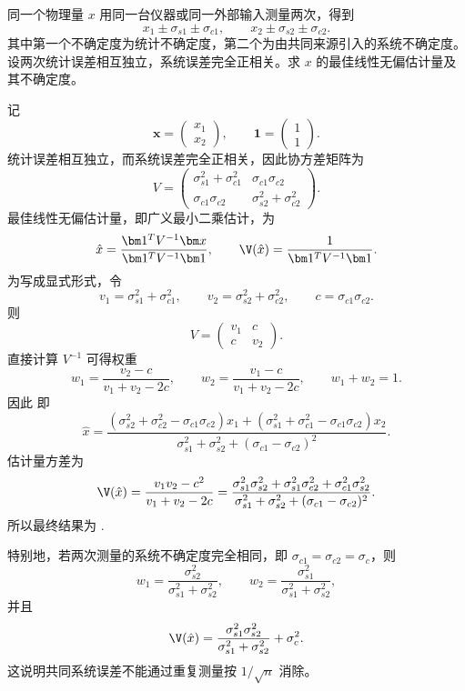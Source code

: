 \begin{question}[相关系统误差下的最佳平均]
同一个物理量 $x$ 用同一台仪器或同一外部输入测量两次，得到
\[
x_1\pm\sigma_{s1}\pm\sigma_{c1},
\qquad
x_2\pm\sigma_{s2}\pm\sigma_{c2}.
\]
其中第一个不确定度为统计不确定度，第二个为由共同来源引入的系统不确定度。设两次统计误差相互独立，系统误差完全正相关。求 $x$ 的最佳线性无偏估计量及其不确定度。
\begin{solution}
记
\[
\bm x=\begin{pmatrix}x_1\\x_2\end{pmatrix},
\qquad
\bm 1=\begin{pmatrix}1\\1\end{pmatrix}.
\]
统计误差相互独立，而系统误差完全正相关，因此协方差矩阵为
\[
V=\begin{pmatrix}
\sigma_{s1}^2+\sigma_{c1}^2 & \sigma_{c1}\sigma_{c2}\\
\sigma_{c1}\sigma_{c2} & \sigma_{s2}^2+\sigma_{c2}^2
\end{pmatrix}.
\]
最佳线性无偏估计量，即广义最小二乘估计，为
\[
\hat x=\frac{\bm 1^TV^{-1}\bm x}{\bm 1^TV^{-1}\bm 1},
\qquad
\V(\hat x)=\frac1{\bm 1^TV^{-1}\bm 1}.
\]
为写成显式形式，令
\[
v_1=\sigma_{s1}^2+\sigma_{c1}^2,
\qquad
v_2=\sigma_{s2}^2+\sigma_{c2}^2,
\qquad
c=\sigma_{c1}\sigma_{c2}.
\]
则
\[
V=\begin{pmatrix}v_1&c\\c&v_2\end{pmatrix}.
\]
直接计算 $V^{-1}$ 可得权重
\[
w_1=\frac{v_2-c}{v_1+v_2-2c},
\qquad
w_2=\frac{v_1-c}{v_1+v_2-2c},
\qquad
w_1+w_2=1.
\]
因此
即
\[
\hat x=
\frac{(\sigma_{s2}^2+\sigma_{c2}^2-\sigma_{c1}\sigma_{c2})x_1
+(\sigma_{s1}^2+\sigma_{c1}^2-\sigma_{c1}\sigma_{c2})x_2}
{\sigma_{s1}^2+\sigma_{s2}^2+(\sigma_{c1}-\sigma_{c2})^2}.
\]
估计量方差为
\[
\V(\hat x)=\frac{v_1v_2-c^2}{v_1+v_2-2c}
=\frac{\sigma_{s1}^2\sigma_{s2}^2+
\sigma_{s1}^2\sigma_{c2}^2+
\sigma_{c1}^2\sigma_{s2}^2}
{\sigma_{s1}^2+\sigma_{s2}^2+(\sigma_{c1}-\sigma_{c2})^2}.
\]
所以最终结果为
.

特别地，若两次测量的系统不确定度完全相同，即 $\sigma_{c1}=\sigma_{c2}=\sigma_c$，则
\[
w_1=\frac{\sigma_{s2}^2}{\sigma_{s1}^2+\sigma_{s2}^2},
\qquad
w_2=\frac{\sigma_{s1}^2}{\sigma_{s1}^2+\sigma_{s2}^2},
\]
并且
\[
\V(\hat x)=\frac{\sigma_{s1}^2\sigma_{s2}^2}{\sigma_{s1}^2+\sigma_{s2}^2}+\sigma_c^2.
\]
这说明共同系统误差不能通过重复测量按 $1/\sqrt n$ 消除。
\end{solution}
\end{question}